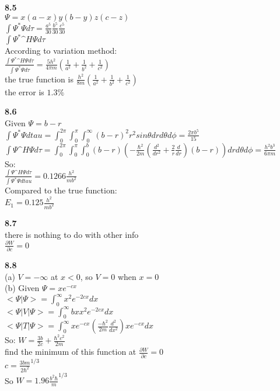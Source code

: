 \documentclass{article}
\begin{document}
\textbf{8.5}\\
$\Psi = x(a-x)y(b-y)z(c-z)$\\
$\int \Psi^*\Psi d\tau = \frac{a^5}{30}\frac{b^5}{30}\frac{c^5}{30}$\\
$\int \Psi^*\^{H}\Psi d\tau$\\
According to variation method:\\
$\frac{\int \Psi^*\^{H}\Psi d\tau}{\int \Psi^*\Psi d\tau} = \frac{5h^2}{4\pi m}(\frac{1}{a^2}+\frac{1}{b^2}+\frac{1}{c^2})$\\
the true function is $\frac{h^2}{8m}(\frac{1}{a^2}+\frac{1}{b^2}+\frac{1}{c^2})$\\
the error is $1.3\%$\\
\newline

\textbf{8.6}\\
Given $\Psi = b-r$\\
$\int \Psi^*\Psi dtau = \int_0^{2\pi}\int_0^{\pi}\int_0^{\infty}(b-r)^2r^2sin\theta drd\theta d\phi = \frac{2\pi b^5}{15}$\\
$\int \Psi \^{H}\Psi d\tau = \int_0^{2\pi}\int_0^{\pi}\int_0^{b}(b-r)(-\frac{\hbar^2}{2m}(\frac{d^2}{dr^2}+\frac{2}{r}\frac{d}{dr})(b-r))dr d\theta d\phi = \frac{h^2b^3}{6\pi m}$\\
So:\\
$\frac{\int \Psi \^{H}\Psi d\tau}{\int \Psi^*\Psi dtau} = 0.1266\frac{h^2}{mb^2}$\\
Compared to the true function:\\
$E_1 = 0.125\frac{h^2}{mb^2}$\\
\newline

\textbf{8.7}\\
there is nothing to do with other info\\
$\frac{\partial W}{\partial c} = 0$\\
\newline

\textbf{8.8}\\
(a) $V = -\infty$ at $x<0$, so $V = 0$ when $x = 0$\\
(b) Given $\Psi = xe^{-cx}$\\
$<\Psi|\Psi> = \int_0^{\infty}x^2e^{-2cx}dx$\\
$<\Psi|V|\Psi> = \int_0^{\infty}bxx^2e^{-2cx}dx$\\
$<\Psi|T|\Psi> = \int_0^{\infty}xe^{-cx}(\frac{-\hbar^2}{2m}\frac{d^2}{dx^2})xe^{-cx}dx$\\
So: $W=\frac{3b}{2c}+\frac{\hbar^2c^2}{2m}$\\
find the minimum of this function at $\frac{\partial W}{\partial c} = 0$\\
$c = \frac{3bm}{2\hbar^2}^{1/3}$\\
So $W = 1.96\frac{b^2\hbar}{m}^{1/3}$\\
\newline
\end{document}
